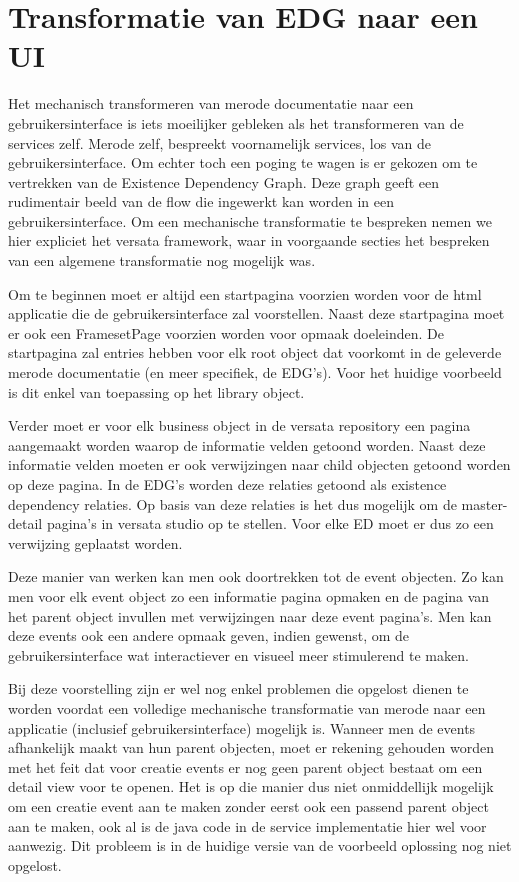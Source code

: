 \section{Transformatie van EDG naar een UI}
\label{sec:E2UI}
Het mechanisch transformeren van merode documentatie naar een gebruikersinterface is iets moeilijker gebleken als het transformeren
van de services zelf. Merode zelf, bespreekt voornamelijk services, los van de gebruikersinterface.
Om echter toch een poging te wagen is er gekozen om te vertrekken van de Existence Dependency Graph. 
Deze graph geeft een rudimentair beeld van de flow die ingewerkt kan worden in een gebruikersinterface. 
Om een mechanische transformatie te bespreken nemen we hier expliciet het versata framework, waar in voorgaande secties het bespreken van een algemene transformatie nog mogelijk was.

Om te beginnen moet er altijd een startpagina voorzien worden voor de html applicatie die de gebruikersinterface zal voorstellen.
Naast deze startpagina moet er ook een FramesetPage voorzien worden voor opmaak doeleinden.
De startpagina zal entries hebben voor elk root object dat voorkomt in de geleverde merode documentatie (en meer specifiek, de EDG's).
Voor het huidige voorbeeld is dit enkel van toepassing op het library object.

Verder moet er voor elk business object in de versata repository een pagina aangemaakt worden waarop de informatie velden getoond worden.
Naast deze informatie velden moeten er ook verwijzingen naar child objecten getoond worden op deze pagina. 
In de EDG's worden deze relaties getoond als existence dependency relaties. Op basis van deze relaties is het dus mogelijk om 
de master-detail pagina's in versata studio op te stellen. Voor elke ED moet er dus zo een verwijzing geplaatst worden.

Deze manier van werken kan men ook doortrekken tot de event objecten. Zo kan men voor elk event object zo een informatie pagina opmaken en de pagina van het parent object invullen met verwijzingen naar deze event pagina's. 
Men kan deze events ook een andere opmaak geven, indien gewenst, om de gebruikersinterface wat interactiever en visueel meer stimulerend te maken.

Bij deze voorstelling zijn er wel nog enkel problemen die opgelost dienen te worden voordat een volledige mechanische transformatie van merode naar een applicatie (inclusief gebruikersinterface) mogelijk is. 
Wanneer men de events afhankelijk maakt van hun parent objecten, moet er rekening gehouden worden met het feit dat voor creatie events er nog geen parent object bestaat om een detail view voor te openen. 
Het is op die manier dus niet onmiddellijk mogelijk om een creatie event aan te maken zonder eerst ook een passend parent object aan te maken, ook al is de java code in de service implementatie hier wel voor aanwezig. 
Dit probleem is in de huidige versie van de voorbeeld oplossing nog niet opgelost.
